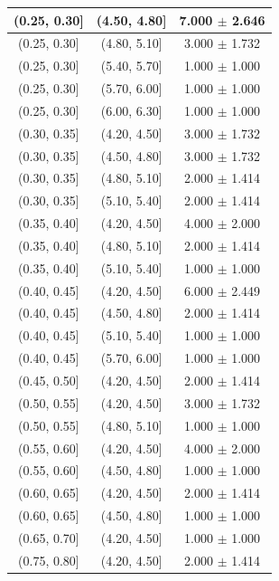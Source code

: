 \begin{longtable}{|c|c|c|}
\hline
(0.25, 0.30] & (4.50, 4.80] & 7.000 $\pm$ 2.646 \\ 
\hline
(0.25, 0.30] & (4.80, 5.10] & 3.000 $\pm$ 1.732 \\ 
\hline
(0.25, 0.30] & (5.40, 5.70] & 1.000 $\pm$ 1.000 \\ 
\hline
(0.25, 0.30] & (5.70, 6.00] & 1.000 $\pm$ 1.000 \\ 
\hline
(0.25, 0.30] & (6.00, 6.30] & 1.000 $\pm$ 1.000 \\ 
\hline
(0.30, 0.35] & (4.20, 4.50] & 3.000 $\pm$ 1.732 \\ 
\hline
(0.30, 0.35] & (4.50, 4.80] & 3.000 $\pm$ 1.732 \\ 
\hline
(0.30, 0.35] & (4.80, 5.10] & 2.000 $\pm$ 1.414 \\ 
\hline
(0.30, 0.35] & (5.10, 5.40] & 2.000 $\pm$ 1.414 \\ 
\hline
(0.35, 0.40] & (4.20, 4.50] & 4.000 $\pm$ 2.000 \\ 
\hline
(0.35, 0.40] & (4.80, 5.10] & 2.000 $\pm$ 1.414 \\ 
\hline
(0.35, 0.40] & (5.10, 5.40] & 1.000 $\pm$ 1.000 \\ 
\hline
(0.40, 0.45] & (4.20, 4.50] & 6.000 $\pm$ 2.449 \\ 
\hline
(0.40, 0.45] & (4.50, 4.80] & 2.000 $\pm$ 1.414 \\ 
\hline
(0.40, 0.45] & (5.10, 5.40] & 1.000 $\pm$ 1.000 \\ 
\hline
(0.40, 0.45] & (5.70, 6.00] & 1.000 $\pm$ 1.000 \\ 
\hline
(0.45, 0.50] & (4.20, 4.50] & 2.000 $\pm$ 1.414 \\ 
\hline
(0.50, 0.55] & (4.20, 4.50] & 3.000 $\pm$ 1.732 \\ 
\hline
(0.50, 0.55] & (4.80, 5.10] & 1.000 $\pm$ 1.000 \\ 
\hline
(0.55, 0.60] & (4.20, 4.50] & 4.000 $\pm$ 2.000 \\ 
\hline
(0.55, 0.60] & (4.50, 4.80] & 1.000 $\pm$ 1.000 \\ 
\hline
(0.60, 0.65] & (4.20, 4.50] & 2.000 $\pm$ 1.414 \\ 
\hline
(0.60, 0.65] & (4.50, 4.80] & 1.000 $\pm$ 1.000 \\ 
\hline
(0.65, 0.70] & (4.20, 4.50] & 1.000 $\pm$ 1.000 \\ 
\hline
(0.75, 0.80] & (4.20, 4.50] & 2.000 $\pm$ 1.414 \\ 
\hline
\end{longtable}
